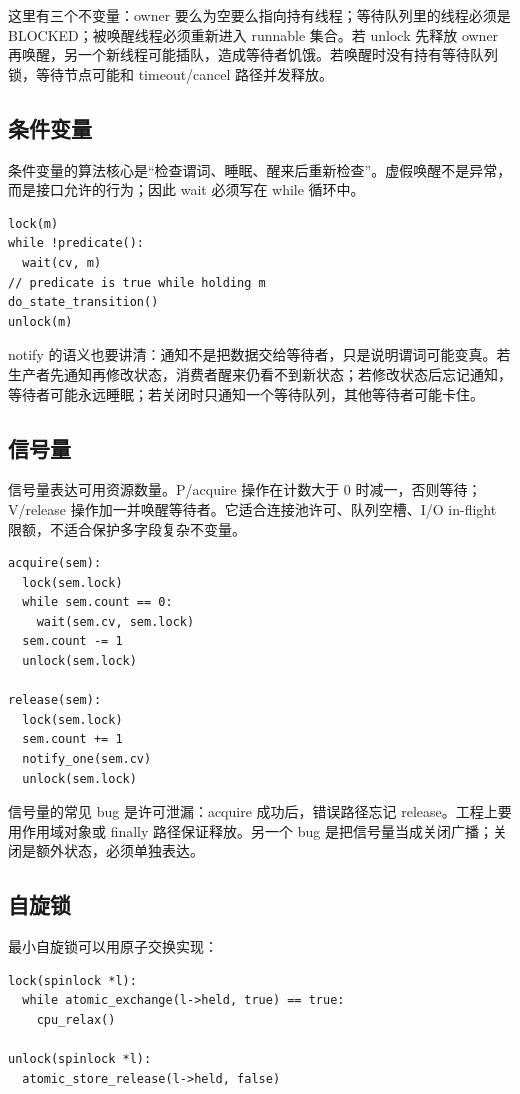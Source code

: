 这里有三个不变量：owner 要么为空要么指向持有线程；等待队列里的线程必须是 BLOCKED；被唤醒线程必须重新进入 runnable 集合。若 unlock 先释放 owner 再唤醒，另一个新线程可能插队，造成等待者饥饿。若唤醒时没有持有等待队列锁，等待节点可能和 timeout/cancel 路径并发释放。

\subsection{条件变量}

条件变量的算法核心是“检查谓词、睡眠、醒来后重新检查”。虚假唤醒不是异常，而是接口允许的行为；因此 wait 必须写在 while 循环中。

\begin{lstlisting}
lock(m)
while !predicate():
  wait(cv, m)
// predicate is true while holding m
do_state_transition()
unlock(m)
\end{lstlisting}

notify 的语义也要讲清：通知不是把数据交给等待者，只是说明谓词可能变真。若生产者先通知再修改状态，消费者醒来仍看不到新状态；若修改状态后忘记通知，等待者可能永远睡眠；若关闭时只通知一个等待队列，其他等待者可能卡住。

\subsection{信号量}

信号量表达可用资源数量。P/acquire 操作在计数大于 0 时减一，否则等待；V/release 操作加一并唤醒等待者。它适合连接池许可、队列空槽、I/O in-flight 限额，不适合保护多字段复杂不变量。

\begin{lstlisting}
acquire(sem):
  lock(sem.lock)
  while sem.count == 0:
    wait(sem.cv, sem.lock)
  sem.count -= 1
  unlock(sem.lock)

release(sem):
  lock(sem.lock)
  sem.count += 1
  notify_one(sem.cv)
  unlock(sem.lock)
\end{lstlisting}

信号量的常见 bug 是许可泄漏：acquire 成功后，错误路径忘记 release。工程上要用作用域对象或 finally 路径保证释放。另一个 bug 是把信号量当成关闭广播；关闭是额外状态，必须单独表达。

\subsection{自旋锁}

最小自旋锁可以用原子交换实现：

\begin{lstlisting}
lock(spinlock *l):
  while atomic_exchange(l->held, true) == true:
    cpu_relax()

unlock(spinlock *l):
  atomic_store_release(l->held, false)
\end{lstlisting}

